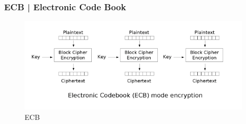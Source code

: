 \textsf{\small }

\subsubsection{ECB | Electronic Code Book}




\textsf{\small }

\begin{figure}[H]
	\centering
	\includegraphics[width=.9\textwidth, height=.9\textheight, keepaspectratio]{./images/aes_modes/ecb_encryption.png} %
	\caption{ECB}
	\label{fig:ecb}
\end{figure}

\textsf{\small } %



\textsf{\small } %

